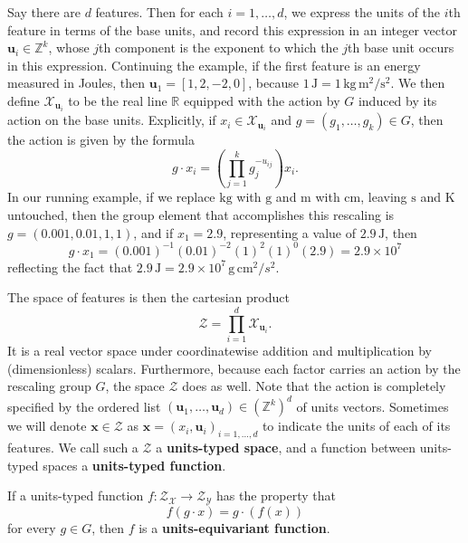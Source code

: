 \documentclass[twoside,11pt]{article}
\newcommand{\unit}[1]{\mathrm{#1}}
\newcommand{\kg}{\unit{kg}}
\newcommand{\g}{\unit{g}}
\newcommand{\m}{\unit{m}}
\newcommand{\cm}{\unit{cm}}
\newcommand{\s}{\unit{s}}
\newcommand{\K}{\unit{K}}
\newcommand{\J}{\unit{J}}
\begin{document}
Say there are $d$ features. Then for each $i=1,\dots, d$, we express the units of the $i$th feature in terms of the base units, and record this expression in an integer vector $\mathbf u_i\in \mathbb Z^k$, whose $j$th component is the exponent to which the $j$th base unit occurs in this expression. Continuing the example, if the first feature is an energy measured in Joules, then $\mathbf u_1 = [1,2,-2,0]$, because $1\,\J = 1\, \kg\,\m^2/\s^2$. We then define $\mathcal X_{\mathbf u_i}$ to be the real line $\mathbb R$ equipped with the action by $G$ induced by its action on the base units. Explicitly, if $x_i\in \mathcal X_{\mathbf u_i}$ and $g=(g_1,\dots,g_k)\in G$, then the action is given by the formula
\begin{equation}
g\cdot x_i = \left(\prod_{j=1}^k g_j^{-u_{ij}}\right) x_i.
\end{equation}
In our running example, if we replace $\kg$ with $\g$ and $\m$ with $\cm$, leaving $\s$ and $\K$ untouched, then the group element that accomplishes this rescaling is $g=(0.001,0.01,1,1)$, and if $x_1=2.9$, representing a value of $2.9\, \J$, then 
\[
g\cdot x_1 = (0.001)^{-1}(0.01)^{-2}(1)^{2}(1)^0 (2.9) = 2.9 \times 10^7
\]
reflecting the fact that $2.9\, \J = 2.9\times 10^7\, \g\,\cm^2/s^2$.

The space of features is then the cartesian product
\begin{equation} \label{eq.Z}
    \mathcal Z = \prod_{i=1}^d \mathcal X_{\mathbf u_i}.
\end{equation}
It is a real vector space under coordinatewise addition and multiplication by (dimensionless) scalars. Furthermore, because each factor carries an action by the rescaling group $G$, the space $\mathcal Z$ does as well. Note that the action is completely specified by the ordered list $(\mathbf u_1,\dots, \mathbf u_d)\in (\mathbb Z^k)^d$ of units vectors. Sometimes we will denote $\mathbf x \in \mathcal Z$ as $\mathbf x=(x_i, \mathbf u_i)_{i=1,\ldots, d}$ to indicate the units of each of its features. We call such a $\mathcal Z$ a \textbf{units-typed space}, and a function between units-typed spaces a \textbf{units-typed function}.

\begin{definition}
If a units-typed function $f: \mathcal Z_\mathcal X \rightarrow \mathcal Z_\mathcal Y$ has the property that
\begin{equation}
    f(g\cdot x) = g\cdot (f(x))
\end{equation}
for every $g\in G$, then $f$ is a \textbf{units-equivariant function}.
\end{definition}
\end{document}
